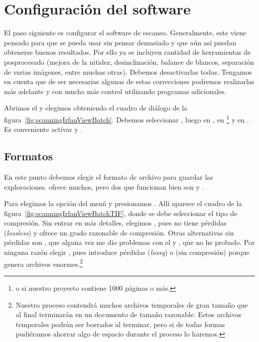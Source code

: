 \documentclass[%
	a5paper,
	10pt,
	twoside,
	openright,
	final,
]{memoir}
\begin{document}
	\section{Configuración del software\label{sec:scanningSoftware}} El paso siguiente es configurar el software de escaneo. Generalmente, este viene pensado para que se pueda usar sin pensar demasiado y que aún así puedan obtenerse buenos resultados. Por ello ya se incluyen cantidad de herramientas de posprocesado (mejora de la nitidez, desinclinación, balance de blancos, separación de varias imágenes, entre muchas otras). Debemos desactivarlas todas. Tengamos en cuenta que de ser necesarias algunas de estas correcciones podremos realizarlas más adelante y con mucho más control utilizando programas adicionales.

	Abrimos el \irfanview y elegimos  obteniendo el cuadro de diálogo de la figura~\ref{fig:scanningIrfanViewBatch}. Debemos seleccionar , luego en , en \footnote{o  si nuestro proyecto contiene 1000 páginas o más.} y en . Es conveniente activar  y .

	\subsection{Formatos\label{sec:scanningSoftwareFormats}} En este punto debemos elegir el formato de archivo para guardar las exploraciones. \irfanview ofrece muchos, pero dos que funcionan bien son \tiff y \png.

	Para \tiff elegimos la opción  del menú  y presionamos . Allí aparece el cuadro de la figura~\ref{fig:scanningIrfanViewBatchTIF}, donde se debe seleccionar el tipo de compresión. Sin entrar en más detalles, elegimos , pues no tiene pérdidas (\emph{lossless}) y ofrece un grado razonable de compresión. Otras alternativas sin pérdidas son , que alguna vez me dio problemas con el \scantailor y , que no he probado. Por ninguna razón elegir , pues introduce pérdidas (\emph{lossy}) o  (sin compresión) porque genera archivos enormes.\footnote{Nuestro proceso contendrá muchos archivos temporales de gran tamaño que al final terminarán en un documento de tamaño razonable. Estos archivos temporales podrán ser borrados al terminar, pero si de todas formas pudiéramos ahorrar algo de espacio durante el proceso lo haremos.}
\end{document}
